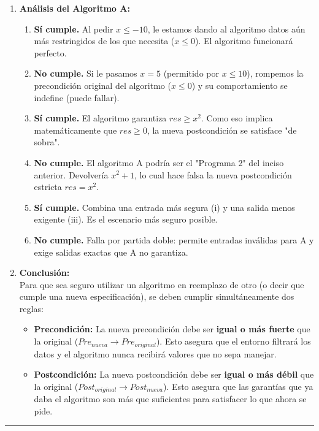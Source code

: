 \begin{enumerate}[label=\textbf{\alph*)}]
    \vspace{0.4cm}
    \item \textbf{Análisis del Algoritmo A:}
    \begin{enumerate}[label=\roman*)]
        \item \textbf{Sí cumple.} Al pedir $x \leq -10$, le estamos dando al algoritmo datos aún más restringidos de los que necesita ($x \leq 0$). El algoritmo funcionará perfecto.
        \item \textbf{No cumple.} Si le pasamos $x = 5$ (permitido por $x \leq 10$), rompemos la precondición original del algoritmo ($x \leq 0$) y su comportamiento se indefine (puede fallar).
        \item \textbf{Sí cumple.} El algoritmo garantiza $res \geq x^2$. Como eso implica matemáticamente que $res \geq 0$, la nueva postcondición se satisface "de sobra".
        \item \textbf{No cumple.} El algoritmo A podría ser el "Programa 2" del inciso anterior. Devolvería $x^2 + 1$, lo cual hace falsa la nueva postcondición estricta $res = x^2$.
        \item \textbf{Sí cumple.} Combina una entrada más segura (i) y una salida menos exigente (iii). Es el escenario más seguro posible.
        \item \textbf{No cumple.} Falla por partida doble: permite entradas inválidas para A y exige salidas exactas que A no garantiza.
    \end{enumerate}

    \vspace{0.4cm}
    \item \textbf{Conclusión:} \\
    Para que sea seguro utilizar un algoritmo en reemplazo de otro (o decir que cumple una nueva especificación), se deben cumplir simultáneamente dos reglas:
    \begin{itemize}
        \item \textbf{Precondición:} La nueva precondición debe ser \textbf{igual o más fuerte} que la original ($Pre_{nueva} \rightarrow Pre_{original}$). Esto asegura que el entorno filtrará los datos y el algoritmo nunca recibirá valores que no sepa manejar.
        \item \textbf{Postcondición:} La nueva postcondición debe ser \textbf{igual o más débil} que la original ($Post_{original} \rightarrow Post_{nueva}$). Esto asegura que las garantías que ya daba el algoritmo son más que suficientes para satisfacer lo que ahora se pide.
    \end{itemize}

\end{enumerate}

\vspace{0.5cm}
\hrule
\vspace{0.5cm}